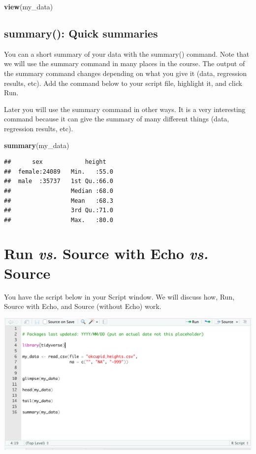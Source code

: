 \documentclass[
]{krantz}
\makeatletter
\newenvironment{Shaded}{\begin{snugshade}}{\end{snugshade}}
\newcommand{\KeywordTok}[1]{\textcolor[rgb]{0.27,0.27,0.27}{\textbf{#1}}}
\newcommand{\NormalTok}[1]{#1}
\newenvironment{kframe}{%
\medskip{}
\setlength{\fboxsep}{.8em}
 \def\at@end@of@kframe{}%
 \ifinner\ifhmode%
  \def\at@end@of@kframe{\end{minipage}}%
  \begin{minipage}{\columnwidth}%
 \fi\fi%
 \def\FrameCommand##1{\hskip\@totalleftmargin \hskip-\fboxsep
 \colorbox{shadecolor}{##1}\hskip-\fboxsep
     \hskip-\linewidth \hskip-\@totalleftmargin \hskip\columnwidth}%
 \MakeFramed {\advance\hsize-\width
   \@totalleftmargin\z@ \linewidth\hsize
   \@setminipage}}%
 {\par\unskip\endMakeFramed%
 \at@end@of@kframe}
\renewenvironment{Shaded}{\begin{kframe}}{\end{kframe}}
\makeatother
\begin{document}
\begin{Shaded}
\begin{Highlighting}[]
\KeywordTok{view}\NormalTok{(my_data)}
\end{Highlighting}
\end{Shaded}

\hypertarget{summary-quick-summaries}{%
\subsection{summary(): Quick summaries}\label{summary-quick-summaries}}

You can a short summary of your data with the summary() command. Note that we will use the summary command in many places in the course. The output of the summary command changes depending on what you give it (data, regression results, etc). Add the command below to your script file, highlight it, and click Run.

Later you will use the summary command in other ways. It is a very interesting command because it can give the summary of many different things (data, regression results, etc).

\begin{Shaded}
\begin{Highlighting}[]
\KeywordTok{summary}\NormalTok{(my_data)}
\end{Highlighting}
\end{Shaded}

\begin{verbatim}
##      sex            height    
##  female:24089   Min.   :55.0  
##  male  :35737   1st Qu.:66.0  
##                 Median :68.0  
##                 Mean   :68.3  
##                 3rd Qu.:71.0  
##                 Max.   :80.0
\end{verbatim}

\hypertarget{run-vs.-source-with-echo-vs.-source}{%
\section{\texorpdfstring{Run \emph{vs.} Source with Echo \emph{vs.} Source}{Run vs. Source with Echo vs. Source}}\label{run-vs.-source-with-echo-vs.-source}}

You have the script below in your Script window. We will discuss how, Run, Source with Echo, and Source (without Echo) work.

\includegraphics[width=0.5\linewidth,height=0.5\textheight]{first_time/images/script_all}
\end{document}
